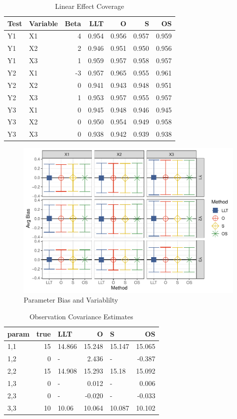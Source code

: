 \documentclass[
]{article}
\begin{document}
\begin{longtable}[t]{l|l|r|r|r|r|r}
\caption{\label{tab:unnamed-chunk-14}Linear Effect Coverage}\\
\hline
Test & Variable & Beta & LLT & O & S & OS\\
\hline
Y1 & X1 & 4 & 0.954 & 0.956 & 0.957 & 0.959\\
\hline
Y1 & X2 & 2 & 0.946 & 0.951 & 0.950 & 0.956\\
\hline
Y1 & X3 & 1 & 0.959 & 0.957 & 0.958 & 0.957\\
\hline
Y2 & X1 & -3 & 0.957 & 0.965 & 0.955 & 0.961\\
\hline
Y2 & X2 & 0 & 0.941 & 0.943 & 0.948 & 0.951\\
\hline
Y2 & X3 & 1 & 0.953 & 0.957 & 0.955 & 0.957\\
\hline
Y3 & X1 & 0 & 0.945 & 0.948 & 0.946 & 0.945\\
\hline
Y3 & X2 & 0 & 0.950 & 0.954 & 0.949 & 0.958\\
\hline
Y3 & X3 & 0 & 0.938 & 0.942 & 0.939 & 0.938\\
\hline
\end{longtable}

\begin{figure}
\centering
\includegraphics{FullSimulation_files/figure-latex/unnamed-chunk-15-1.pdf}
\caption{\label{fig:unnamed-chunk-15}Parameter Bias and Variablilty}
\end{figure}

\begin{longtable}[t]{l|r|l|r|l|r}
\caption{\label{tab:unnamed-chunk-16}Observation Covariance Estimates}\\
\hline
param & true & LLT & O & S & OS\\
\hline
1,1 & 15 & 14.866 & 15.248 & 15.147 & 15.065\\
\hline
1,2 & 0 & - & 2.436 & - & -0.387\\
\hline
2,2 & 15 & 14.908 & 15.293 & 15.18 & 15.092\\
\hline
1,3 & 0 & - & 0.012 & - & 0.006\\
\hline
2,3 & 0 & - & -0.020 & - & -0.033\\
\hline
3,3 & 10 & 10.06 & 10.064 & 10.087 & 10.102\\
\hline
\end{longtable}
\end{document}
